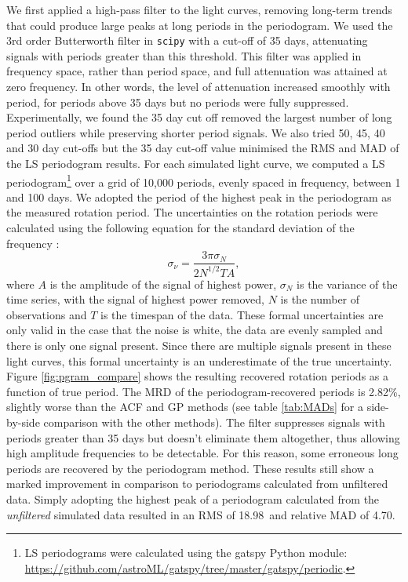 \documentclass[a4paper,fleqn,usenatbib,useAMS]{mnras}
\newcommand{\response}[1]{{#1}}
\newcommand{\oldpgramRMS}{18.98}
\newcommand{\oldpercentpgramMAD}{4.70}
\newcommand{\percentpgramMAD}{2.82}
\begin{document}
\response{We first applied a high-pass filter to the light curves, removing
long-term trends that could produce large peaks at long periods in the
periodogram.
We used the 3rd order Butterworth filter in {\tt scipy} with a cut-off
of 35 days, attenuating signals with periods greater than this threshold.
This filter was applied in frequency space, rather than period space, and full
attenuation was attained at zero frequency.
In other words, the level of attenuation increased smoothly with period, for
periods above 35 days but no periods were fully suppressed.
Experimentally, we found the 35 day cut off removed the largest number of long
period outliers while preserving shorter period signals.
We also tried 50, 45, 40 and 30 day cut-offs but the 35 day cut-off value
minimised the RMS and MAD of the LS periodogram results.}
For each simulated light curve, we computed a LS periodogram\footnote{LS
periodograms were calculated using the gatspy Python module:
\url{https://github.com/astroML/gatspy/tree/master/gatspy/periodic}.} over a
grid of 10,000 periods, evenly spaced in frequency, between 1 and 100 days.
We adopted the period of the highest peak in the periodogram as the measured
rotation period.
\response{The uncertainties on the rotation periods were calculated using the
following equation for the standard deviation of the frequency
\citep{Horne1986, Kovacs1981}:
\begin{equation}
    \sigma_{\nu} = \frac{3\pi\sigma_N}{2N^{1/2}TA},
\end{equation}
where $A$ is the amplitude of the signal of highest power, $\sigma_N$ is the
variance of the time series, with the signal of highest power removed, $N$
is the number of observations and $T$ is the timespan of the data.
These formal uncertainties are only valid in the case that the noise is white,
the data are evenly sampled and there is only one signal present.
Since there are multiple signals present in these light curves, this formal
uncertainty is an underestimate of the true uncertainty.
}
Figure \ref{fig:pgram_compare} shows the resulting recovered rotation periods
as a function of true period.
\response{The MRD of the periodogram-recovered periods is \percentpgramMAD\%,
slightly worse than the ACF and GP methods (see table \ref{tab:MADs} for
a side-by-side comparison with the other methods).
The filter suppresses signals with periods greater than 35 days but doesn't
eliminate them altogether, thus allowing high amplitude frequencies to be
detectable.
For this reason, some erroneous long periods are recovered by the periodogram
method.
These results still show a marked improvement in comparison to periodograms
calculated from unfiltered data.
Simply adopting the highest peak of a periodogram calculated from the {\it
unfiltered} simulated data resulted in an RMS of \oldpgramRMS\ and relative
MAD of \oldpercentpgramMAD.}
\end{document}
